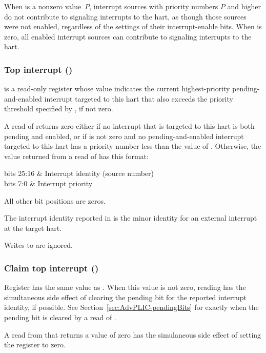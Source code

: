 When  is a nonzero value~$P$, interrupt sources with
priority numbers $P$ and higher do not contribute to signaling
interrupts to the hart, as though those sources were not enabled,
regardless of the settings of their interrupt-enable bits.
When  is zero, all enabled interrupt sources can
contribute to signaling interrupts to the hart.

\subsubsection{Top interrupt ()}

 is a read-only register whose value indicates the current
highest-priority pending-and-enabled interrupt targeted to this hart
that also exceeds the priority threshold specified by ,
if not zero.

A read of  returns zero either if no interrupt that is targeted
to this hart is both pending and enabled, or if  is not
zero and no pending-and-enabled interrupt targeted to this hart has a
priority number less than the value of .
Otherwise, the value returned from a read of  has this format:
\begin{displayLinesTable}[l@{\ \quad}l]
bits 25:16 & Interrupt identity (source number) \\
bits 7:0   & Interrupt priority \\
\end{displayLinesTable}
All other bit positions are zeros.

The interrupt identity reported in  is the minor identity for
an external interrupt at the target hart.

Writes to  are ignored.

\subsubsection{Claim top interrupt ()}

Register  has the same value as .
When this value is not zero, reading  has the simultaneous
side effect of clearing the pending bit for the reported interrupt
identity, if possible.
See Section~\ref{sec:AdvPLIC-pendingBits} for exactly when the pending
bit is cleared by a read of .

A read from  that returns a value of zero has the simulaneous
side effect of setting the  register to zero.


